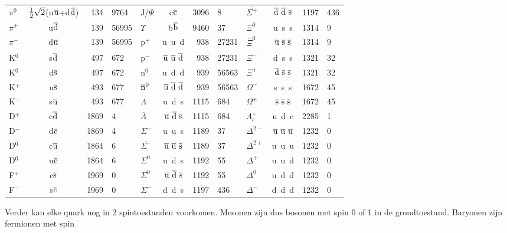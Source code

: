 \begin{center}
\begin{tabular}{||l|cr@{,}l||l|cr@{,}l||l|cr@{,}l||}
\hline
$\pi^0$&$\mbox{$\frac{1}{2}$}\sqrt{2}$(u$\overline{\rm u}$+d$\overline{\rm d}$)&134&9764&J/$\Psi$&c$\overline{\rm c}$&3096&8&$\overline{\Sigma^+}$&$\overline{\rm d}~\overline{\rm d}~\overline{\rm s}$&1197&436\rule{0pt}{15pt}\\
$\pi^+$&u$\overline{\rm d}$&139&56995&$\Upsilon$&b$\overline{\rm b}$&9460&37 &$\Xi^0$&u~s~s&1314&9\\
\cline{5-8}
$\pi^-$&d$\overline{\rm u}$&139&56995&p$^+$&u~u~d&938&27231&$\overline{\Xi}^0$&$\overline{\rm u}~\overline{\rm s}~\overline{\rm s}$&1314&9\\
K$^0$&s$\overline{\rm d}$&497&672&p$^-$&$\overline{\rm u}~\overline{\rm u}~\overline{\rm d}$&938&27231&$\Xi^-$&d~s~s&1321&32\\
K$^0$&d$\overline{\rm s}$&497&672&n$^0$&u~d~d&939&56563&$\Xi^+$&$\overline{\rm d}~\overline{\rm s}~\overline{\rm s}$&1321&32\\
K$^+$&u$\overline{\rm s}$&493&677&$\overline{\rm n}^0$&$\overline{\rm u}~\overline{\rm d}~\overline{\rm d}$&939&56563&$\Omega^-$&s~s~s&1672&45\\
K$^-$&s$\overline{\rm u}$&493&677&$\Lambda$&u~d~s&1115&684&$\Omega^+$&$\overline{\rm s}~\overline{\rm s}~\overline{\rm s}$&1672&45\\
D$^+$&c$\overline{\rm d}$&1869&4&$\overline{\Lambda}$&$\overline{\rm u}~\overline{\rm d}~\overline{\rm s}$&1115&684&$\Lambda_c^+$&u~d~c&2285&1\\
D$^-$&d$\overline{\rm c}$&1869&4&$\Sigma^+$&u~u~s&1189&37&$\Delta^{2-}$&$\overline{\rm u}~\overline{\rm u}~\overline{\rm u}$&1232&0\\
D$^0$&c$\overline{\rm u}$&1864&6&$\overline{\Sigma^-}$&$\overline{\rm u}~\overline{\rm u}~\overline{\rm s}$&1189&37&$\Delta^{2+}$&u~u~u&1232&0\\
D$^0$&u$\overline{\rm c}$&1864&6&$\Sigma^0$&u~d~s&1192&55&$\Delta^+$&u~u~d&1232&0\\
F$^+$&c$\overline{\rm s}$&1969&0&$\Sigma^0$&$\overline{\rm u}~\overline{\rm d}~\overline{\rm s}$&1192&55&$\Delta^0$&u~d~d&1232&0\\
F$^-$&s$\overline{\rm c}$&1969&0&$\Sigma^-$&d~d~s&1197&436&$\Delta^-$&d~d~d&1232&0\\
\hline
\end{tabular}
\end{center}
Verder kan elke quark nog in 2 spintoestanden voorkomen. Mesonen zijn dus
bosonen met spin 0 of 1 in de grondtoestand. Baryonen zijn fermionen met spin
